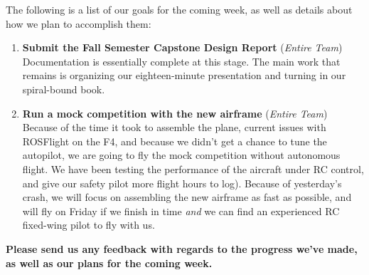 \documentclass[]{../auvsi_doc}
\begin{document}
The following is a list of our goals for the coming week, as well as details about how we plan to accomplish them:

\begin{enumerate}
\item \textbf{Submit the Fall Semester Capstone Design Report} (\textit{Entire Team}) \\
Documentation is essentially complete at this stage. The main work that remains is organizing our eighteen-minute presentation and turning in our spiral-bound book.
\item \textbf{Run a mock competition with the new airframe} (\textit{Entire Team}) \\
Because of the time it took to assemble the plane, current issues with ROSFlight on the F4, and because we didn't get a chance to tune the autopilot, we are going to fly the mock competition without autonomous flight. We have been testing the performance of the aircraft under RC control, and give our safety pilot more flight hours to log). Because of yesterday's crash, we will focus on assembling the new airframe as fast as possible, and will fly on Friday if we finish in time \textit{and} we can find an experienced RC fixed-wing pilot to fly with us.
\end{enumerate}
\textbf{Please send us any feedback with regards to the progress we've made, as well as our plans for the coming week.}
\end{document}
